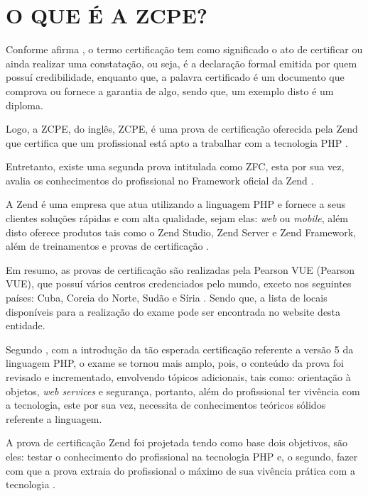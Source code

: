 \chapter{O QUE É A ZCPE?}
\label{zcpe}

Conforme afirma , o termo certificação tem como
significado o ato de certificar ou ainda realizar uma constatação, ou seja, é a
declaração formal emitida por quem possuí credibilidade, enquanto que, a palavra
certificado é um documento que comprova ou fornece a garantia de algo, sendo
que, um exemplo disto é um diploma.

Logo, a \acs{ZCPE}, do inglês, \acl{ZCPE}, é uma prova de certificação oferecida
pela \acs{Zend} que certifica que um profissional está apto a trabalhar com a
tecnologia \acs{PHP} \cite{websiteZendZCPE}.

Entretanto, existe uma segunda prova intitulada como \ac{ZFC},
esta por sua vez, avalia os conhecimentos do profissional no
Framework oficial da \acs{Zend} \cite{websiteZendZFC}.

A \acs{Zend} é uma empresa que atua utilizando a linguagem \acs{PHP} e fornece
a seus clientes soluções rápidas e com alta qualidade, sejam elas:  \textit{web}
ou \textit{mobile}, além disto oferece produtos tais como o \acs{Zend Studio},
\acs{Zend Server} e \acs{Zend Framework}, além de treinamentos e provas de
certificação \cite{websiteZendCompany}.

Em resumo, as provas de certificação são realizadas pela \acs{Pearson VUE}
(\acl{Pearson VUE}), que possuí vários centros credenciados pelo mundo,  exceto
nos seguintes países: Cuba, Coreia do Norte, Sudão e Síria
\cite{websiteZendZFC}. Sendo que, a lista de locais disponíveis para a
realização do exame pode ser encontrada no website desta entidade.

Segundo , com a introdução da tão
esperada certificação referente a versão 5 da linguagem \acs{PHP}, o exame se
tornou mais amplo, pois, o conteúdo da prova foi revisado e incrementado,
envolvendo  tópicos adicionais, tais como: orientação à objetos, \textit{web
services} e segurança, portanto, além do profissional ter vivência com a
tecnologia, este por sua vez, necessita de conhecimentos teóricos sólidos
referente a linguagem.

A prova de certificação \acs{Zend} foi projetada tendo como base dois objetivos, são
eles: testar o conhecimento do profissional na tecnologia \acs{PHP} e, o
segundo, fazer com que a prova extraia do profissional o máximo de sua vivência
prática com a tecnologia \cite{theZendPHPCertificationPracticeTestBook}.

